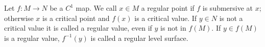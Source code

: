 Let $f: M \to N$ be a $C^1$ map. We call $x \in M$ a regular point if $f$ is submersive at $x$; otherwise $x$ is a critical point and $f(x)$ is a critical value. If $y \in N$ is not a critical value it is called a regular value, even if $y$ is not in $f(M)$. If $y \in f(M)$ is a regular value, $f^{-1}(y)$ is called a regular level surface.

